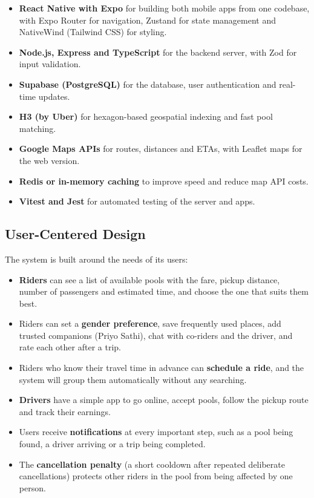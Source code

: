 \begin{itemize}
  \item \textbf{React Native with Expo} for building both mobile apps from one
        codebase, with Expo Router for navigation, Zustand for state management
        and NativeWind (Tailwind CSS) for styling.
  \item \textbf{Node.js, Express and TypeScript} for the backend server, with
        Zod for input validation.
  \item \textbf{Supabase (PostgreSQL)} for the database, user authentication
        and real-time updates.
  \item \textbf{H3 (by Uber)} for hexagon-based geospatial indexing and fast
        pool matching.
  \item \textbf{Google Maps APIs} for routes, distances and ETAs, with Leaflet
        maps for the web version.
  \item \textbf{Redis or in-memory caching} to improve speed and reduce map API
        costs.
  \item \textbf{Vitest and Jest} for automated testing of the server and apps.
\end{itemize}

\subsection{User-Centered Design}

The system is built around the needs of its users:

\begin{itemize}
  \item \textbf{Riders} can see a list of available pools with the fare, pickup
        distance, number of passengers and estimated time, and choose the one
        that suits them best.
  \item Riders can set a \textbf{gender preference}, save frequently used
        places, add trusted companions (Priyo Sathi), chat with co-riders and
        the driver, and rate each other after a trip.
  \item Riders who know their travel time in advance can \textbf{schedule a
        ride}, and the system will group them automatically without any
        searching.
  \item \textbf{Drivers} have a simple app to go online, accept pools, follow
        the pickup route and track their earnings.
  \item Users receive \textbf{notifications} at every important step, such as a
        pool being found, a driver arriving or a trip being completed.
  \item The \textbf{cancellation penalty} (a short cooldown after repeated
        deliberate cancellations) protects other riders in the pool from being
        affected by one person.
\end{itemize}

